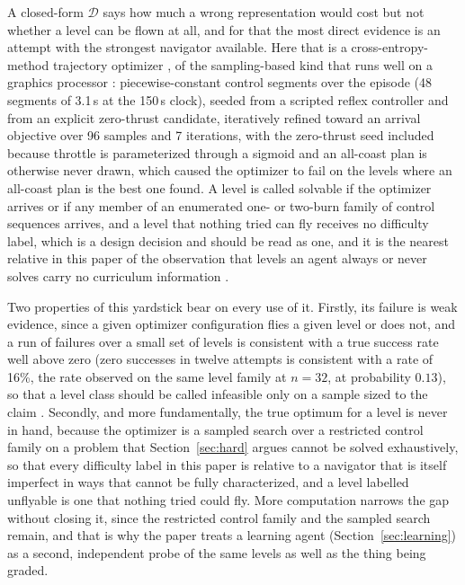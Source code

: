 \documentclass[11pt]{article}
\newcommand{\dd}{\mathcal{D}}
\begin{document}
A closed-form $\dd$ says how much a wrong representation would cost but not
whether a level can be flown at all, and for that the most direct evidence
is an attempt with the strongest navigator available. Here that is a
cross-entropy-method trajectory optimizer \cite{rubinstein1999}, of the
sampling-based kind that runs well on a graphics processor
\cite{williams2017}: piecewise-constant control segments over the episode
(48 segments of 3.1\,s at the 150\,s clock), seeded from a scripted reflex
controller and from an explicit zero-thrust candidate, iteratively refined
toward an arrival objective over 96 samples and 7 iterations, with the
zero-thrust seed included because throttle is parameterized through a
sigmoid and an all-coast plan is otherwise never drawn, which caused the
optimizer to fail on the levels where an all-coast plan is the best one
found. A level is called
solvable if the optimizer arrives or if any member of an enumerated one- or
two-burn family of control sequences arrives, and a level that nothing tried can
fly receives no difficulty label, which is a design decision and should be
read as one, and it is the nearest relative in this paper of the observation that
levels an agent always or never solves carry no curriculum information
\cite{rutherford2024,dennis2020}.

Two properties of this yardstick bear on every use of it. Firstly, its
failure is weak evidence, since a given optimizer configuration flies a given
level or does not, and a run of failures over a small set of levels is
consistent with a true success rate well above zero (zero successes in
twelve attempts is consistent with a rate of 16\%, the rate observed on the
same level family at $n = 32$, at probability $0.13$), so that a level class
should be called infeasible only on a sample sized to the claim
\cite{agarwal2021,colas2018}. Secondly, and more fundamentally, the true
optimum for a level is never in hand, because the optimizer is a sampled
search over a restricted control family on a problem that
Section~\ref{sec:hard} argues cannot be solved exhaustively, so that
every difficulty label in this paper is relative to a navigator that is
itself imperfect in ways that cannot be fully characterized, and a level
labelled unflyable is one that nothing tried could fly. More computation
narrows the gap without closing it, since the restricted control family and
the sampled search remain, and that is why the paper treats a learning agent (Section~\ref{sec:learning}) as
a second, independent probe of the same levels as well as the thing being
graded.
\end{document}
